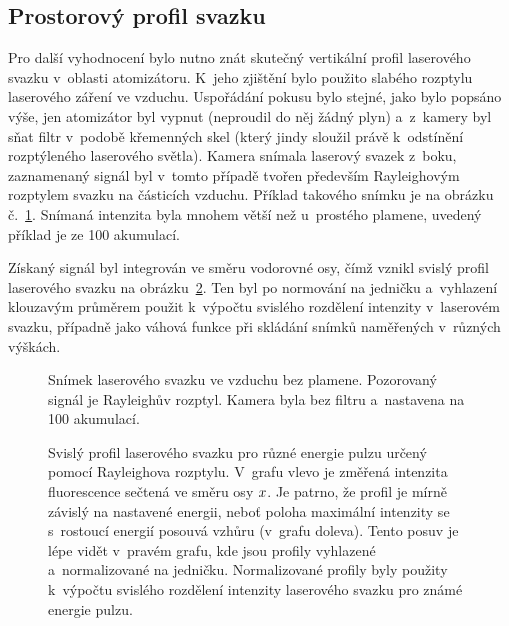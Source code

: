 \subsection{Prostorový profil svazku}
\label{sec:lif-rayleigh}
Pro další vyhodnocení bylo nutno znát skutečný vertikální profil
laserového svazku v~oblasti atomizátoru.
K~jeho zjištění bylo použito slabého rozptylu laserového záření ve vzduchu.
Uspořádání pokusu bylo stejné, jako bylo popsáno výše,
jen atomizátor byl vypnut (neproudil do něj žádný plyn)
a~z~kamery byl sňat filtr v~podobě křemenných skel
(který jindy sloužil právě k~odstínění rozptýleného laserového světla).
Kamera snímala laserový svazek z~boku, zaznamenaný signál byl v~tomto
případě tvořen především Rayleighovým rozptylem svazku na částicích vzduchu.
Příklad takového snímku je na obrázku č.~\ref{fig:lif-beam}.
Snímaná intenzita byla mnohem větší než u~prostého plamene,
uvedený příklad je ze \num{100} akumulací.

Získaný signál byl integrován ve směru vodorovné osy,
čímž vznikl svislý profil laserového svazku
na obrázku~\ref{fig:lif-rayleigh-profile}.
Ten byl po normování na jedničku a~vyhlazení klouzavým průměrem
použit k~výpočtu svislého rozdělení intenzity v~laserovém svazku,
případně jako váhová funkce při skládání snímků naměřených v~různých
výškách.

\begin{figure}[htp]
	\centering
	
	\caption{Snímek laserového svazku ve vzduchu bez plamene.
		Pozorovaný signál je Rayleighův rozptyl.
		Kamera byla bez filtru a~nastavena na \num{100} akumulací.}
	\label{fig:lif-beam}
\end{figure}

\begin{figure}[htb]
	\centering
	\hfill
	
	\caption{Svislý profil laserového svazku pro různé energie pulzu
		určený pomocí Rayleighova rozptylu.
		V~grafu vlevo je změřená intenzita fluorescence sečtená
		ve směru osy $x$.
		Je patrno, že profil je mírně závislý na nastavené energii,
		neboť poloha maximální intenzity se s~rostoucí energií posouvá
		vzhůru (v~grafu doleva).
		Tento posuv je lépe vidět v~pravém grafu, kde jsou profily
		vyhlazené a~normalizované na jedničku.
		Normalizované profily byly použity k~výpočtu svislého
		rozdělení intenzity laserového svazku pro známé energie pulzu.}
	\label{fig:lif-rayleigh-profile}
\end{figure}

